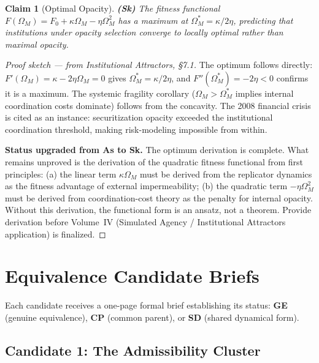 \documentclass[11pt, a4paper]{book}
\theoremstyle{flyxion}
\newtheorem{claim}[theorem]{Claim}
\theoremstyle{remark}
\begin{document}
\begin{claim}[Optimal Opacity] \textbf{(Sk)}
The fitness functional $F(\Omega_M) = F_0 + \kappa\Omega_M -
\eta\Omega_M^2$ has a maximum at $\Omega_M^* = \kappa/2\eta$,
predicting that institutions under opacity selection converge to
locally optimal rather than maximal opacity.
\end{claim}
\begin{proof}[Proof sketch --- from Institutional Attractors, §7.1]
The optimum follows directly: $F'(\Omega_M) = \kappa - 2\eta\Omega_M
= 0$ gives $\Omega_M^* = \kappa/2\eta$, and $F''(\Omega_M^*)
= -2\eta < 0$ confirms it is a maximum. The systemic fragility
corollary ($\Omega_M > \Omega_M^*$ implies internal coordination
costs dominate) follows from the concavity. The 2008 financial
crisis is cited as an instance: securitization opacity exceeded
the institutional coordination threshold, making risk-modeling
impossible from within.

\textbf{Status upgraded from As to Sk.} The optimum derivation
is complete. What remains unproved is the derivation of the
quadratic fitness functional from first principles:
(a) the linear term $\kappa\Omega_M$ must be derived from the
replicator dynamics as the fitness advantage of external
impermeability; (b) the quadratic term $-\eta\Omega_M^2$ must
be derived from coordination-cost theory as the penalty for
internal opacity. Without this derivation, the functional form
is an ansatz, not a theorem. Provide derivation before
Volume~IV (Simulated Agency / Institutional Attractors
application) is finalized.
\end{proof}

\chapter{Equivalence Candidate Briefs}

Each candidate receives a one-page formal brief establishing
its status: \textbf{GE} (genuine equivalence), \textbf{CP}
(common parent), or \textbf{SD} (shared dynamical form).

\section{Candidate 1: The Admissibility Cluster}
\end{document}
